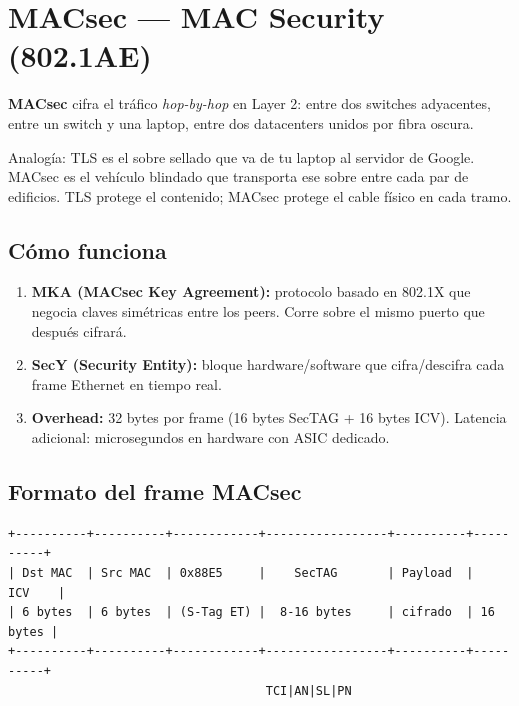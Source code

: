 \section{ MACsec --- MAC Security (802.1AE)}

\begin{concepto}
\textbf{MACsec} cifra el tráfico \emph{hop-by-hop} en Layer 2: entre dos switches
adyacentes, entre un switch y una laptop, entre dos datacenters unidos por fibra oscura.

Analogía: TLS es el sobre sellado que va de tu laptop al servidor de Google.
MACsec es el vehículo blindado que transporta ese sobre entre cada par de edificios.
TLS protege el contenido; MACsec protege el cable físico en cada tramo.
\end{concepto}

\subsection{Cómo funciona}

\begin{enumerate}
    \item \textbf{MKA (MACsec Key Agreement):} protocolo basado en 802.1X que negocia
          claves simétricas entre los peers. Corre sobre el mismo puerto que después cifrará.
    \item \textbf{SecY (Security Entity):} bloque hardware/software que cifra/descifra
          cada frame Ethernet en tiempo real.
    \item \textbf{Overhead:} 32 bytes por frame (16 bytes SecTAG + 16 bytes ICV). Latencia
          adicional: microsegundos en hardware con ASIC dedicado.
\end{enumerate}

\subsection{Formato del frame MACsec}

\begin{lstlisting}
+----------+----------+------------+-----------------+----------+----------+
| Dst MAC  | Src MAC  | 0x88E5     |    SecTAG       | Payload  |   ICV    |
| 6 bytes  | 6 bytes  | (S-Tag ET) |  8-16 bytes     | cifrado  | 16 bytes |
+----------+----------+------------+-----------------+----------+----------+
                                    TCI|AN|SL|PN
\end{lstlisting}

